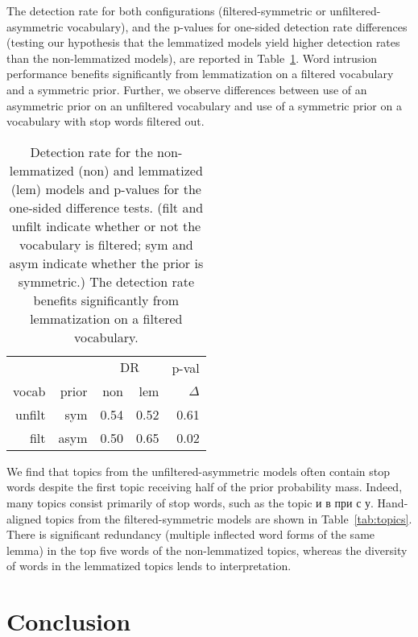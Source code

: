 \documentclass[11pt,letterpaper]{article}
\newcommand{\DR}{\ensuremath{\textrm{DR}}}
\begin{document}
{The detection rate for both configurations (filtered-symmetric or unfiltered-asymmetric
vocabulary), and the
p-values for one-sided detection rate differences (testing our
hypothesis that the lemmatized models yield higher detection rates than
the non-lemmatized models), are reported in
Table~\ref{tab:detection-rate}.  Word intrusion performance benefits
significantly from lemmatization on a filtered vocabulary and a
symmetric prior.
Further, we observe differences
between use of an asymmetric prior on an unfiltered vocabulary and
use of a symmetric prior on a vocabulary with stop words filtered out.

\begin{table}
  \centering
    \begin{tabular}{rrrrr}
        \toprule
              &              & \multicolumn{2}{c}{$\DR$} &       p-val   \\
        vocab & prior        & non         & lem &         $\Delta$ \\\midrule
        unfilt & sym         &          0.54 &          0.52 &          0.61 \\
        filt & asym & 0.50 & 0.65 & 0.02 \\
        \bottomrule
    \end{tabular}
    \caption{Detection rate for the non-lemmatized (non) and
        lemmatized (lem) models
        and p-values for the one-sided difference tests.
        (filt and unfilt indicate whether or not the vocabulary is
        filtered; sym and asym indicate whether the prior is
        symmetric.)
        The detection rate benefits significantly from lemmatization on
        a filtered vocabulary.}
    \label{tab:detection-rate}
\end{table}

We find that topics from the unfiltered-asymmetric models often contain
stop words despite the first topic receiving half of the prior
probability mass.  Indeed, many topics consist primarily of stop
words, such as the topic {и в при с у}.
Hand-aligned topics from the filtered-symmetric models
are shown in Table~\ref{tab:topics}.
There is significant redundancy (multiple inflected word forms of the
same lemma) in the top five words of the non-lemmatized topics, whereas
the diversity of words in the lemmatized topics lends to
interpretation.


\section{Conclusion}\label{sec:conclusion}

}
\end{document}
